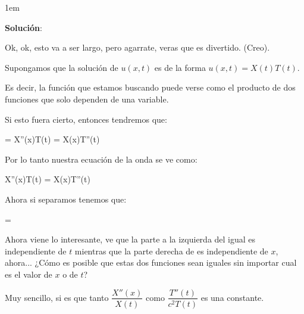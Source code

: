 \documentclass[12pt, fleqn]{report}                             %
\newenvironment{SmallIndentation}[1][0.75em]                    %
        {\begin{adjustwidth}{#1}{}\begin{footnotesize}}             %
        {\end{footnotesize}\end{adjustwidth}}                       %
\def \Eq {equation}                                             %
\newenvironment{MultiLineEquation*}[1]                          %
        {\begin{\Eq*}\begin{alignedat}{#1}}                         %
        {\end{alignedat}\end{\Eq*}}                                 %
\DeclareMathOperator \Space     {\quad}                         %
\theoremstyle{break}                                            %
\newcommand \UpperDerivate[3] {\dfrac{d^{#3} \; #1}{d#2^{#3}}}  %
\newcommand \UpperPartial[3]                                    %
        {\dfrac{\partial^{#3} \; #1}{\partial#2^{#3}}}              %
\begin{document}
                \begin{SmallIndentation}[1em]
                    \textbf{Solución}:
                    
                    Ok, ok, esto va a ser largo, pero agarrate, veras que es
                    divertido. (Creo).

                    Supongamos que la solución de $u(x,t)$ es de la forma
                    $u(x,t) = X(t)T(t)$.

                    Es decir, la función que estamos buscando puede verse
                    como el producto de dos funciones que solo dependen de 
                    una variable.

                    Si esto fuera cierto, entonces tendremos que:
                    \begin{MultiLineEquation*}{3}
                        \UpperPartial{u(x, t)}{x}{2} = X''(x)T(t)
                        \Space\Space
                        \Space\Space
                        \UpperPartial{u(x, t)}{t}{2} = X(x)T''(t)
                    \end{MultiLineEquation*}

                    Por lo tanto nuestra ecuación de la onda se ve como:
                    \begin{MultiLineEquation*}{3}
                        X''(x)T(t) =  \; X(x)T''(t)
                    \end{MultiLineEquation*}
                        

                    Ahora si separamos tenemos que:
                    \begin{MultiLineEquation*}{3}
                         = 
                    \end{MultiLineEquation*}


                    \clearpage

                    Ahora viene lo interesante, ve que la parte a la izquierda
                    del igual es independiente de $t$ mientras que la parte
                    derecha de es independiente de $x$, ahora... ¿Cómo es 
                    posible que estas dos funciones sean iguales sin importar
                    cual es el valor de $x$ o de $t$?

                    Muy sencillo, si es que tanto $\dfrac{X''(x)}{X(t)}$ como
                    $\dfrac{T''(t)}{c^2 T(t)}$ es una constante.


\end{SmallIndentation}
\end{document}
